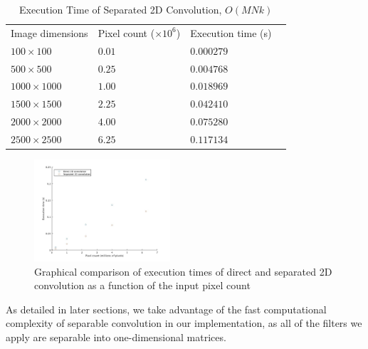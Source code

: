 \documentclass[journal]{IEEEtran}
\begin{document}
\begin{table}[H]
	\small
	\centering
	\caption{Execution Time of Separated 2D Convolution, $O(MNk)$}
	\label{convolution-complexity-comparison}
	\begin{tabular}{llll}
	 Image dimensions & Pixel count ($\times10^6$) & Execution time (s) \\
	 $100 \times 100$ & $0.01$ & $0.000279$ \\
	 $500 \times 500$ & $0.25$ & $0.004768$ \\
	 $1000 \times 1000$ & $1.00$ & $0.018969$ \\
	 $1500 \times 1500$ & $2.25$ & $0.042410$ \\
	 $2000 \times 2000$ & $4.00$ & $0.075280$ \\
	 $2500 \times 2500$ & $6.25$ & $0.117134$ \\
	\end{tabular}
\end{table}
\begin{figure}
	\centering
	\includegraphics[width=0.45\textwidth]{naive_separable_convolution_execution_time.jpg}
	\caption{Graphical comparison of execution times of direct and separated 2D convolution as a function of the input pixel count}
    \label{direct-separated-convolution-graph}
\end{figure}
As detailed in later sections, we take advantage of the fast computational complexity of separable convolution in our implementation, as all of the filters we apply are separable into one-dimensional matrices.
\end{document}

